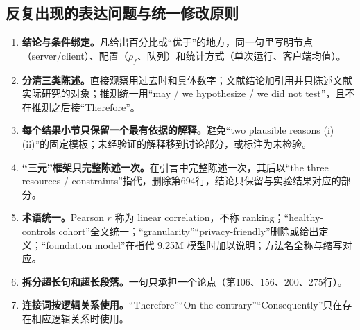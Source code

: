 \documentclass[11pt,a4paper]{ctexart}
\begin{document}
\subsection{反复出现的表达问题与统一修改原则}
\begin{enumerate}[leftmargin=*]
\item \textbf{结论与条件绑定。}凡给出百分比或“优于”的地方，同一句里写明节点（server/client）、配置（$\rho_f$、队列）和统计方式（单次运行、客户端均值）。
\item \textbf{分清三类陈述。}直接观察用过去时和具体数字；文献结论加引用并只陈述文献实际研究的对象；推测统一用“may / we hypothesize / we did not test”，且不在推测之后接“Therefore”。
\item \textbf{每个结果小节只保留一个最有依据的解释。}避免“two plausible reasons (i)(ii)”的固定模板；未经验证的解释移到讨论部分，或标注为未检验。
\item \textbf{“三元”框架只完整陈述一次。}在引言中完整陈述一次，其后以“the three resources / constraints”指代，删除第694行，结论只保留与实验结果对应的部分。
\item \textbf{术语统一。}Pearson $r$ 称为 linear correlation，不称 ranking；“healthy-controls cohort”全文统一；“granularity”“privacy-friendly”删除或给出定义；“foundation model”在指代 9.25M 模型时加以说明；方法名全称与缩写对应。
\item \textbf{拆分超长句和超长段落。}一句只承担一个论点（第106、156、200、275行）。
\item \textbf{连接词按逻辑关系使用。}“Therefore”“On the contrary”“Consequently”只在存在相应逻辑关系时使用。
\end{enumerate}
\end{document}
